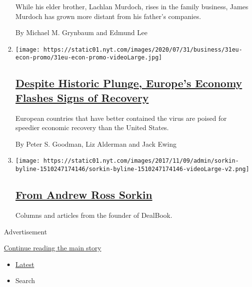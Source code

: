 \begin{enumerate}
  While his elder brother, Lachlan Murdoch, rises in the family
  business, James Murdoch has grown more distant from his father's
  companies.

  By Michael M. Grynbaum and Edmund Lee
\item
  \texttt{[image: https://static01.nyt.com/images/2020/07/31/business/31eu-econ-promo/31eu-econ-promo-videoLarge.jpg]}

  \hypertarget{despite-historic-plunge-europes-economy-flashes-signs-of-recovery}{%
  \subsection{\texorpdfstring{\href{/2020/07/31/business/europe-economy-recovery-coronavirus.html}{Despite
  Historic Plunge, Europe's Economy Flashes Signs of
  Recovery}}{Despite Historic Plunge, Europe's Economy Flashes Signs of Recovery}}\label{despite-historic-plunge-europes-economy-flashes-signs-of-recovery}}

  European countries that have better contained the virus are poised for
  speedier economic recovery than the United States.

  By Peter S. Goodman, Liz Alderman and Jack Ewing
\item
  \texttt{[image: https://static01.nyt.com/images/2017/11/09/admin/sorkin-byline-1510247174146/sorkin-byline-1510247174146-videoLarge-v2.png]}

  \hypertarget{from-andrew-ross-sorkin}{%
  \subsection{\texorpdfstring{\href{/interactive/2017/business/dealbook/sorkin-byline.html}{From
  Andrew Ross
  Sorkin}}{From Andrew Ross Sorkin}}\label{from-andrew-ross-sorkin}}

  Columns and articles from the founder of DealBook.
\end{enumerate}

Advertisement

\protect\hyperlink{after-mid1}{Continue reading the main story}

\begin{itemize}
\tightlist
\item
  \protect\hyperlink{stream-panel}{Latest}
\item
  Search
\end{itemize}

